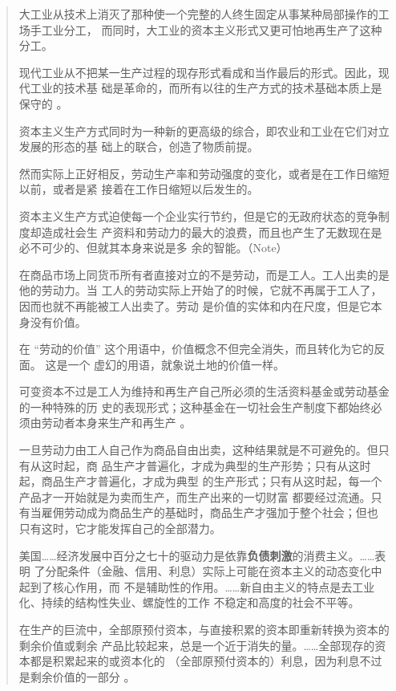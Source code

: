 \begin{quotation}
大工业从技术上消灭了那种使一个完整的人终生固定从事某种局部操作的工场手工业分工，
而同时，大工业的资本主义形式又更可怕地再生产了这种分工。

现代工业从不把某一生产过程的现存形式看成和当作最后的形式。因此，现代工业的技术基
础是革命的，而所有以往的生产方式的技术基础本质上是保守的
。

资本主义生产方式同时为一种新的更高级的综合，即农业和工业在它们对立发展的形态的基
础上的联合，创造了物质前提。

然而实际上正好相反，劳动生产率和劳动强度的变化，或者是在工作日缩短以前，或者是紧
接着在工作日缩短以后发生的。

资本主义生产方式迫使每一个企业实行节约，但是它的无政府状态的竞争制度却造成社会生
产资料和劳动力的最大的浪费，而且也产生了无数现在是必不可少的、但就其本身来说是多
余的智能。（Note）

在商品市场上同货币所有者直接对立的不是劳动，而是工人。工人出卖的是他的劳动力。当
工人的劳动实际上开始了的时候，它就不再属于工人了，因而也就不再能被工人出卖了。劳动
是价值的实体和内在尺度，但是它本身没有价值。

在 “劳动的价值” 这个用语中，价值概念不但完全消失，而且转化为它的反面。 这是一个
虚幻的用语，就象说土地的价值一样。 


可变资本不过是工人为维持和再生产自己所必须的生活资料基金或劳动基金的一种特殊的历
史的表现形式；这种基金在一切社会生产制度下都始终必须由劳动者本身来生产和再生产
。

一旦劳动力由工人自己作为商品自由出卖，这种结果就是不可避免的。但只有从这时起，商
品生产才普遍化，才成为典型的生产形势；只有从这时起，商品生产才普遍化，才成为典型
的生产形式；只有从这时起，每一个产品才一开始就是为卖而生产，而生产出来的一切财富
都要经过流通。只有当雇佣劳动成为商品生产的基础时，商品生产才强加于整个社会；但也
只有这时，它才能发挥自己的全部潜力。

美国……经济发展中百分之七十的驱动力是依靠\textbf{负债刺激}的消费主义。……表明
了分配条件（金融、信用、利息）实际上可能在资本主义的动态变化中起到了核心作用，而
不是辅助性的作用。……新自由主义的特点是去工业化、持续的结构性失业、螺旋性的工作
不稳定和高度的社会不平等。 




在生产的巨流中，全部原预付资本，与直接积累的资本即重新转换为资本的剩余价值或剩余
产品比较起来，总是一个近于消失的量。……全部现存的资本都是积累起来的或资本化的
（全部原预付资本的）利息，因为利息不过是剩余价值的一部分
。


\end{quotation}
